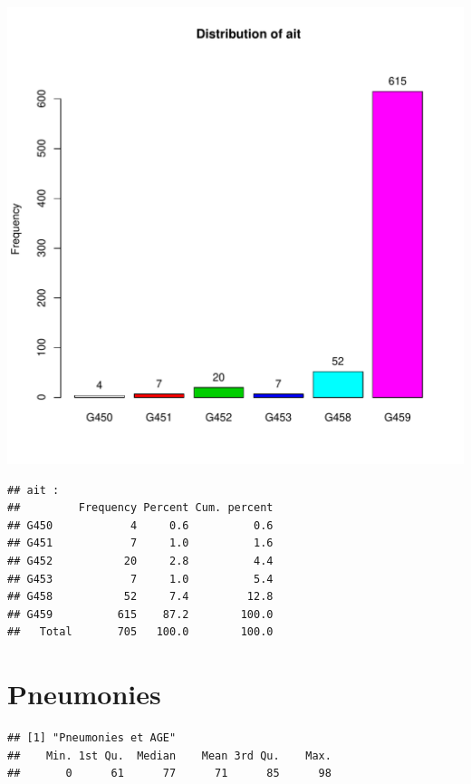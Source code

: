 \documentclass[12pt,english,french,twoside]{book}\usepackage[]{graphicx}\usepackage[]{color}
\makeatletter
\def\maxwidth{ %
  \ifdim\Gin@nat@width>\linewidth
    \linewidth
  \else
    \Gin@nat@width
  \fi
}
\newenvironment{kframe}{%
 \def\at@end@of@kframe{}%
 \ifinner\ifhmode%
  \def\at@end@of@kframe{\end{minipage}}%
  \begin{minipage}{\columnwidth}%
 \fi\fi%
 \def\FrameCommand##1{\hskip\@totalleftmargin \hskip-\fboxsep
 \colorbox{shadecolor}{##1}\hskip-\fboxsep
     \hskip-\linewidth \hskip-\@totalleftmargin \hskip\columnwidth}%
 \MakeFramed {\advance\hsize-\width
   \@totalleftmargin\z@ \linewidth\hsize
   \@setminipage}}%
 {\par\unskip\endMakeFramed%
 \at@end@of@kframe}
\newenvironment{knitrout}{}{} %
\makeatother
\begin{document}
\begin{knitrout}
\color{fgcolor}
\includegraphics[width=\maxwidth]{figure/ait} 
\begin{kframe}\begin{verbatim}
## ait :  
##         Frequency Percent Cum. percent
## G450            4     0.6          0.6
## G451            7     1.0          1.6
## G452           20     2.8          4.4
## G453            7     1.0          5.4
## G458           52     7.4         12.8
## G459          615    87.2        100.0
##   Total       705   100.0        100.0
\end{verbatim}
\end{kframe}
\end{knitrout}


\section{Pneumonies}

\begin{knitrout}
\color{fgcolor}\begin{kframe}


{\ttfamily\noindent\color{warningcolor}{\#\# Warning: impossible d'ouvrir le fichier '../mes\_fonctions.R' : Aucun fichier ou dossier de ce type}}

{\ttfamily\noindent\bfseries\color{errorcolor}{\#\# Error: impossible d'ouvrir la connexion}}\begin{verbatim}
## [1] "Pneumonies et AGE"
##    Min. 1st Qu.  Median    Mean 3rd Qu.    Max. 
##       0      61      77      71      85      98
\end{verbatim}
\end{kframe}
\end{knitrout}
\end{document}
